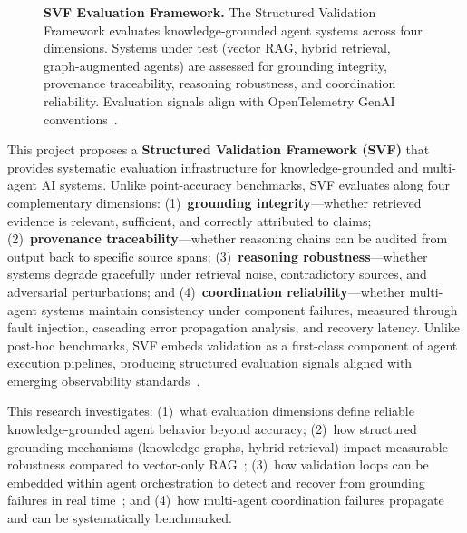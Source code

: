\documentclass[conference, 10pt]{IEEEtran}
\begin{document}
\begin{figure}[t]
{
    }%
    \caption{\textbf{SVF Evaluation Framework.} The Structured Validation Framework evaluates knowledge-grounded agent systems across four dimensions. Systems under test (vector RAG, hybrid retrieval, graph-augmented agents) are assessed for grounding integrity, provenance traceability, reasoning robustness, and coordination reliability. Evaluation signals align with OpenTelemetry GenAI conventions~\cite{OpenTelemetryGenAI2024}.}
    \label{fig:framework}
    \vspace{-0.5em}
\end{figure}

This project proposes a \textbf{Structured Validation Framework (SVF)} that provides systematic evaluation infrastructure for knowledge-grounded and multi-agent AI systems. Unlike point-accuracy benchmarks, SVF evaluates along four complementary dimensions: (1)~\textbf{grounding integrity}---whether retrieved evidence is relevant, sufficient, and correctly attributed to claims; (2)~\textbf{provenance traceability}---whether reasoning chains can be audited from output back to specific source spans; (3)~\textbf{reasoning robustness}---whether systems degrade gracefully under retrieval noise, contradictory sources, and adversarial perturbations; and (4)~\textbf{coordination reliability}---whether multi-agent systems maintain consistency under component failures, measured through fault injection, cascading error propagation analysis, and recovery latency. Unlike post-hoc benchmarks, SVF embeds validation as a first-class component of agent execution pipelines, producing structured evaluation signals aligned with emerging observability standards~\cite{OpenTelemetryGenAI2024}.

This research investigates: (1)~what evaluation dimensions define reliable knowledge-grounded agent behavior beyond accuracy; (2)~how structured grounding mechanisms (knowledge graphs, hybrid retrieval) impact measurable robustness compared to vector-only RAG~\cite{Lewis2020RAG}; (3)~how validation loops can be embedded within agent orchestration to detect and recover from grounding failures in real time~\cite{Asai2024SelfRAG}; and (4)~how multi-agent coordination failures propagate and can be systematically benchmarked.
\end{document}
